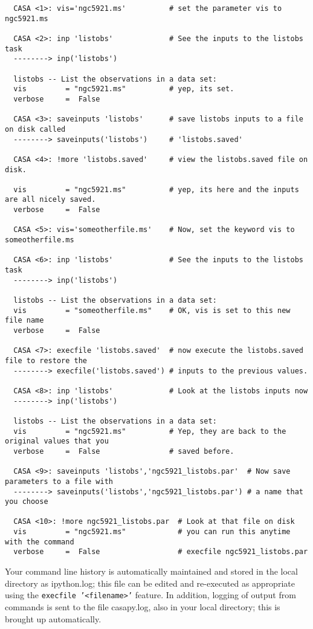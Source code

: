 \small
\begin{verbatim}
  CASA <1>: vis='ngc5921.ms'          # set the parameter vis to ngc5921.ms

  CASA <2>: inp 'listobs'             # See the inputs to the listobs task
  --------> inp('listobs')

  listobs -- List the observations in a data set:
  vis         = "ngc5921.ms"          # yep, its set.  
  verbose     =  False

  CASA <3>: saveinputs 'listobs'      # save listobs inputs to a file on disk called 
  --------> saveinputs('listobs')     # 'listobs.saved'

  CASA <4>: !more 'listobs.saved'     # view the listobs.saved file on disk.  

  vis         = "ngc5921.ms"          # yep, its here and the inputs are all nicely saved.  
  verbose     =  False

  CASA <5>: vis='someotherfile.ms'    # Now, set the keyword vis to someotherfile.ms

  CASA <6>: inp 'listobs'             # See the inputs to the listobs task
  --------> inp('listobs')

  listobs -- List the observations in a data set:
  vis         = "someotherfile.ms"    # OK, vis is set to this new file name
  verbose     =  False

  CASA <7>: execfile 'listobs.saved'  # now execute the listobs.saved file to restore the 
  --------> execfile('listobs.saved') # inputs to the previous values. 

  CASA <8>: inp 'listobs'             # Look at the listobs inputs now
  --------> inp('listobs')

  listobs -- List the observations in a data set:
  vis         = "ngc5921.ms"          # Yep, they are back to the original values that you 
  verbose     =  False                # saved before.  

  CASA <9>: saveinputs 'listobs','ngc5921_listobs.par'  # Now save parameters to a file with 
  --------> saveinputs('listobs','ngc5921_listobs.par') # a name that you choose

  CASA <10>: !more ngc5921_listobs.par  # Look at that file on disk
  vis         = "ngc5921.ms"            # you can run this anytime with the command 
  verbose     =  False                  # execfile ngc5921_listobs.par
\end{verbatim}
\normalsize


Your command line history is automatically maintained and stored in
the local directory as ipython.log; this file can be edited and
re-executed as appropriate using the {\tt execfile '<filename>'} feature.
In addition, logging of output from commands is sent to the file
casapy.log, also in your local directory; this is brought up
automatically.

